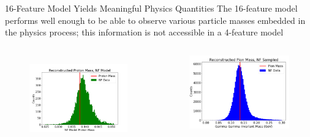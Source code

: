 \documentclass[aspectratio=169]{beamer}
\begin{document}
\begin{frame}{16-Feature Model Yields Meaningful Physics Quantities}
The 16-feature model performs well enough to be able to observe various particle masses embedded in the physics process; this information is not accessible in a 4-feature model
   \begin{columns}

            \begin{figure}[H]
            \centering
            \includegraphics[width=.87\textwidth]{images/RecoMass/protons}
            \label{fig:clas6}
            \end{figure}
            
             \begin{figure}[H]
            \centering
            \includegraphics[width=.87\textwidth]{images/RecoMass/pions}
            \end{figure}
    \end{columns}

\end{frame}
\end{document}
